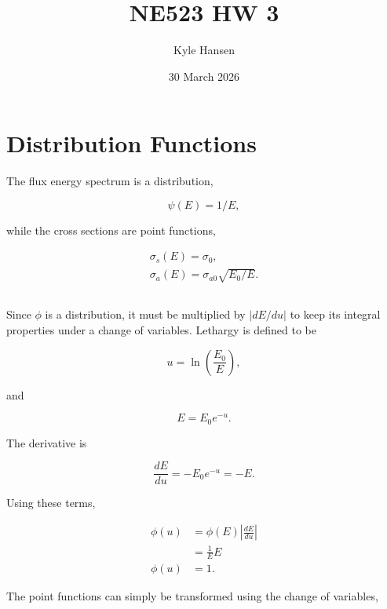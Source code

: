 \documentclass{hw-template}
\author{Kyle Hansen}
\date{30 March 2026}
\title{NE523 HW 3}
\begin{document}
\maketitle

\section{Distribution Functions}

The flux energy spectrum is a distribution,

\begin{equation}
    \psi(E) = 1/E,
\end{equation}

while the cross sections are point functions,

\begin{gather}
    \sigma_s(E) = \sigma_0,\\
    \sigma_a(E) = \sigma_{a0}\sqrt{E_0/E}.
\end{gather}

\subsection{}

Since $\phi$ is a distribution, it must be multiplied by $|dE/du|$ to keep its integral properties under a change of variables. Lethargy is defined to be

\begin{equation}
    u = \ln\left( \frac{E_0}{E} \right),
\end{equation}

and

\begin{equation}
    E = E_0e^{-u}.
\end{equation}

The derivative is

\begin{equation}
    \frac{dE}{du} = -E_0e^{-u} = -E.
\end{equation}

Using these terms,

\begin{align}
    \phi(u) &= \phi(E)\left| \frac{dE}{du} \right|\\
     &= \frac{1}{E} E\\
     \phi(u) &= 1.
\end{align}

The point functions can simply be transformed using the change of variables,
\end{document}

